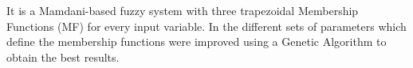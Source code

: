 \documentclass[conference]{IEEEtran}
\begin{document}
It is a Mamdani-based fuzzy system \cite{iancu2012} with three
trapezoidal Membership Functions (MF) for every input variable. 
In \cite{salem_evo18} the different sets of parameters which define the membership functions were improved using a Genetic Algorithm to obtain the best results.


\end{document}
